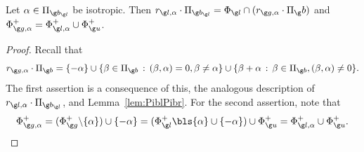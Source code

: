 \documentclass[12pt]{amsart}
\begin{document}
\begin{lem}
\label{lem:rlaPipb}
Let $\alpha\in\Pi_{\g b_{\g l}}$ be isotropic. Then  $r_{\g l,\alpha}\cdot \Pi_{\g b_{\g l}}=
\Phi_{\g l}\cap
(r_{\g g,\alpha}\cdot \Pi_\g b)$ and $\Phi_{\g g,\alpha}^+=\Phi_{\g l,\alpha}^+\cup \Phi_{\g u}^+$. 
\end{lem}
\begin{proof}
Recall that 
\[
r_{\g g,\alpha}\cdot \Pi_{\g b}=\{-\alpha\}
\cup
\{\beta\in\Pi_{\g b}\,:\,(\beta,\alpha)=0,\beta\neq \alpha\}
\cup
\{\beta+\alpha\,:\,\beta\in\Pi_{\g b},(\beta,\alpha)\neq 0\}.
\]
The first assertion is a consequence of  this, the analogous description of $r_{\g l,\alpha}\cdot \Pi_{\g b_{\g l}}$, and Lemma~\ref{lem:PiblPibr}. 
For the second assertion, note that  \[
\Phi^+_{\g g,\alpha}=(\Phi^+_{\g g}\backslash\{\alpha\})\cup\{-\alpha\}
=(\Phi_{\g l}^+\bls\{\alpha\}\cup \{-\alpha\})\cup\Phi_{\g u}^+=\Phi_{\g l,\alpha}^+\cup\Phi_{\g u}^+.\qedhere
\] \end{proof}
\end{document}
